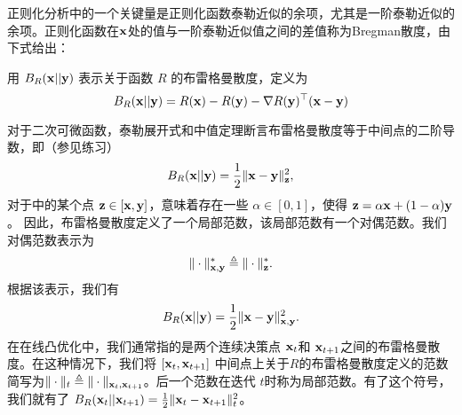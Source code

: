 正则化分析中的一个关键量是正则化函数泰勒近似的余项，尤其是一阶泰勒近似的余项。正则化函数在$\mathbf x$处的值与一阶泰勒近似值之间的差值称为Bregman散度，由下式给出：
\begin{definition}
	用 $B_{R}(\mathbf x||\mathbf y)$ 表示关于函数 ${R}$ 的布雷格曼散度，定义为
	$$ B_{R}(\mathbf x||\mathbf y) = {R}(\mathbf x) - {R}(\mathbf y) - \nabla {R}(\mathbf y)^\top  (\mathbf x-\mathbf y)   $$
\end{definition}

对于二次可微函数，泰勒展开式和中值定理断言布雷格曼散度等于中间点的二阶导数，即（参见练习）
$$ B_{R}(\mathbf x||\mathbf y) = \frac{1}{2} \|\mathbf x - \mathbf y\|_{\mathbf z}^2, $$ 
对于中的某个点 $\mathbf z \in [\mathbf x,\mathbf y]$，意味着存在一些 $\alpha \in [0,1]$，使得 $\mathbf z = \alpha \mathbf x + (1-\alpha) \mathbf y$。
因此，布雷格曼散度定义了一个局部范数，该局部范数有一个对偶范数。我们对偶范数表示为
$$ \| \cdot \|_{\mathbf x,\mathbf y}^*  \triangleq \| \cdot \|_{\mathbf z}^*.$$ 
根据该表示，我们有
$$ B_{R}(\mathbf x||\mathbf y) = \frac{1}{2} \|\mathbf x - \mathbf y\|_{\mathbf x,\mathbf y} ^2. $$ 
在在线凸优化中，我们通常指的是两个连续决策点 $\mathbf x_t$和 $\mathbf x_{t+1}$之间的布雷格曼散度。在这种情况下，我们将 $[\mathbf x_t,\mathbf x_{t+1}]$ 中间点上关于${R}$的布雷格曼散度定义的范数简写为$\| \cdot \|_t \triangleq \| \cdot \|_{\mathbf x_t,\mathbf x_{t+1}} $。后一个范数在迭代 $t$时称为局部范数。有了这个符号，我们就有了 $B_{R}(\mathbf x_t||\mathbf x_{t+1}) = \frac{1}{2} \|\mathbf x_t - \mathbf x_{t+1}\|_t^2 $。

